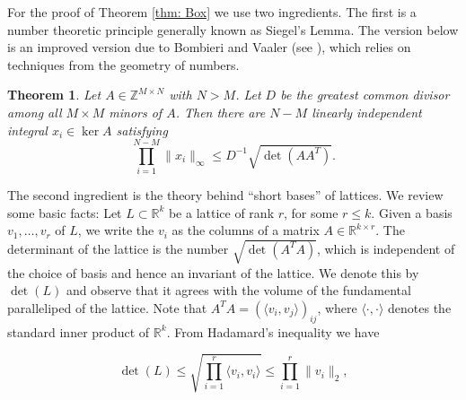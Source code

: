 \documentclass[12pt,a4paper]{amsart}
\newcommand{\RR}{\mathbb{R}}
\newcommand{\ZZ}{\mathbb{Z}}
\newtheorem{thm}{Theorem}[section]
\theoremstyle{plain}
\theoremstyle{definition}
\begin{document}
For the proof of Theorem \ref{thm: Box} we use two ingredients. The first is a number
theoretic principle generally known as Siegel's Lemma. The version below is an improved
version due to Bombieri and Vaaler (see \cite[Theorem 2]{MR707346}), which relies on techniques from the geometry of numbers.

\begin{thm}\label{thm: siegel}
Let $A\in \ZZ^{M\times N}$ with $N>M$. Let $D$ be the greatest common divisor among all $M\times M$ minors of $A$. Then there are $N-M$ linearly independent integral $x_i\in \ker A$ satisfying
\[\prod_{i=1}^{N-M}\|x_i\|_\infty\leq D^{-1}\sqrt{\det (AA^T)}.\]
\end{thm}

The second ingredient is the theory behind ``short bases'' of lattices. We review some
basic facts: Let $L\subset \RR^k$ be a lattice of rank $r$, for some $r\leq k$. Given a
basis $v_1,\ldots,v_r$ of $L$, we write the $v_i$ as the columns of a matrix $A\in
\RR^{k\times r}$. The determinant of the lattice is the number $\sqrt{\det(A^T A)}$, which
is independent of the choice of basis and hence an invariant of the lattice. We denote
this by $\det(L)$ and observe that it agrees with the volume of the fundamental
paralleliped of the lattice. Note that $A^{T}A = (\langle v_{i}, v_{j} \rangle)_{ij}$,
where $\langle \cdot, \cdot \rangle$ denotes the standard inner product of
$\mathbb{R}^{k}$. From Hadamard's inequality \cite[Theorem 7.8.1]{MR2978290} we have

\begin{equation}\label{eq: Hadamard}
	\det(L)\leq \sqrt{\prod_{i=1}^{r} \langle v_{i}, v_{i} \rangle} \leq\prod_{i=1}^r \|v_i\|_2,
\end{equation}
\end{document}
